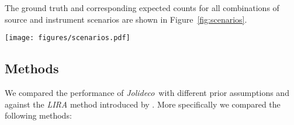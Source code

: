 \documentclass[twocolumn]{aastex631}
\newcommand{\chandra}{\textit{Chandra}~}
\newcommand{\chandranospace}{\textit{Chandra}}
\newcommand{\xmm}{\textit{XMM}~}
\newcommand{\jolideco}{\textit{Jolideco}~}
\begin{document}
    The ground truth and corresponding expected counts for all combinations of source and instrument scenarios are shown in Figure~\ref{fig:scenarios}. 
    
    \begin{figure*}
        \centering\texttt{[image: figures/scenarios.pdf]}
        \caption{Illustration of the expected counts for the different source scenarios we used to generate test datasets. The source patterns shown are for the {\sl (A)}  {\tt points}, {\sl (B) {\tt asterism}}, {\sl (C)} {\tt shield}, and {\sl (D)} {\tt spiral} cases (see Section~\ref{sec:app:A}. For the \chandra instrument scenario we convolve the ground truth image with a narrow Gaussian shaped PSF of width $\sigma=2$~pix. For the \xmm scenario we used a Gaussian shaped PSF with a width of $\sigma=6$~pix and an effective area that is five times larger than that of \chandranospace. All images are of size $128{\times}128$ pixels.
        }
        \label{fig:scenarios}
    \end{figure*}
     
    \subsection{Methods}
    \label{subsec:methods}
    We compared the performance of \jolideco with different prior assumptions and against the \textit{LIRA} method introduced by \cite{Esch2004}. More specifically we compared the following methods:
\end{document}
